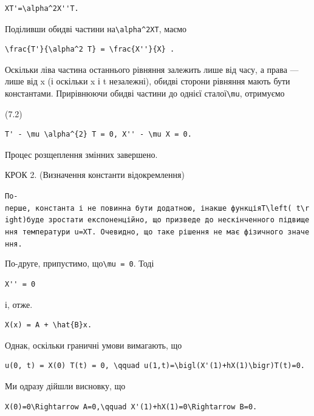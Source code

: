 \documentclass[
  ukrainian,
]{article}
\begin{document}
\begin{verbatim}
XT'=\alpha^2X''T.
\end{verbatim}

Поділивши обидві частини на\texttt{\textbackslash{}alpha\^{}2XT}, маємо

\begin{verbatim}
\frac{T'}{\alpha^2 T} = \frac{X''}{X} .
\end{verbatim}

Оскільки ліва частина останнього рівняння залежить лише від часу, а
права --- лише від x (і оскільки x і t незалежні), обидві сторони
рівняння мають бути константами. Прирівнюючи обидві частини до однієї
сталої\texttt{\textbackslash{}mu}, отримуємо

(7.2)

\begin{verbatim}
T' - \mu \alpha^{2} T = 0, X'' - \mu X = 0.
\end{verbatim}

Процес розщеплення змінних завершено.

КРОК 2. (Визначення константи відокремлення)

\texttt{По-перше,\ константа\ і\ не\ повинна\ бути\ додатною,\ інакше\ функція\textquotesingle{}T\textbackslash{}left(\ t\textbackslash{}right)\textquotesingle{}буде\ зростати\ експоненційно,\ що\ призведе\ до\ нескінченного\ підвищення\ температури\ u=XT.\ Очевидно,\ що\ таке\ рішення\ не\ має\ фізичного\ значення.}

По-друге, припустимо, що\texttt{\textbackslash{}mu\ =\ 0}. Тоді

\begin{verbatim}
X'' = 0
\end{verbatim}

і, отже.

\begin{verbatim}
X(x) = A + \hat{B}x.
\end{verbatim}

Однак, оскільки граничні умови вимагають, що

\begin{verbatim}
u(0, t) = X(0) T(t) = 0, \qquad u(1,t)=\bigl(X'(1)+hX(1)\bigr)T(t)=0.
\end{verbatim}

Ми одразу дійшли висновку, що

\begin{verbatim}
X(0)=0\Rightarrow A=0,\qquad X'(1)+hX(1)=0\Rightarrow B=0.
\end{verbatim}
\end{document}
